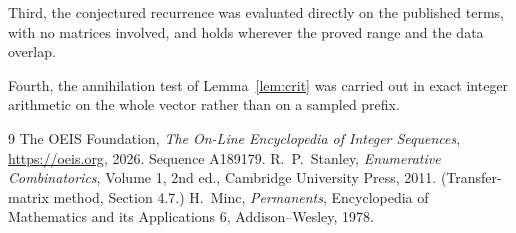 \documentclass[11pt,a4paper]{article}
\theoremstyle{plain}
\theoremstyle{definition}
\begin{document}
Third, the conjectured recurrence was evaluated directly on the published terms, with no
matrices involved, and holds wherever the proved range and the data overlap.

Fourth, the annihilation test of Lemma~\ref{lem:crit} was carried out in exact integer
arithmetic on the whole vector rather than on a sampled prefix.

\begin{thebibliography}{9}
 The OEIS Foundation, \emph{The On-Line Encyclopedia of Integer
Sequences}, \url{https://oeis.org}, 2026. Sequence A189179.
 R.~P.~Stanley, \emph{Enumerative Combinatorics}, Volume 1, 2nd ed.,
Cambridge University Press, 2011. (Transfer-matrix method, Section 4.7.)
 H.~Minc, \emph{Permanents}, Encyclopedia of Mathematics and its
Applications 6, Addison--Wesley, 1978.
\end{thebibliography}
\end{document}
